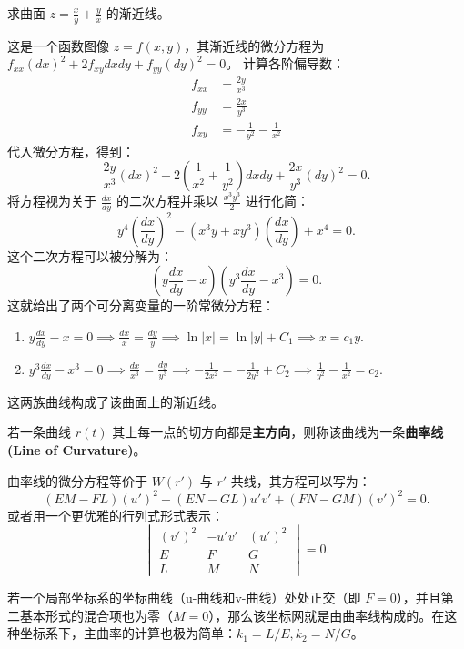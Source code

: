 \documentclass[lang=cn,10pt,thmcnt=section]{elegantbook}
\begin{document}
\begin{example}[求双曲抛物面的渐近线]
    求曲面 $z = \frac{x}{y} + \frac{y}{x}$ 的渐近线。
    
    这是一个函数图像 $z=f(x,y)$，其渐近线的微分方程为 $f_{xx}(dx)^2 + 2f_{xy}dxdy + f_{yy}(dy)^2 = 0$。
    计算各阶偏导数：
    \begin{align*}
        f_{xx} &= \frac{2y}{x^3} \\
        f_{yy} &= \frac{2x}{y^3} \\
        f_{xy} &= -\frac{1}{y^2} - \frac{1}{x^2}
    \end{align*}
    代入微分方程，得到：
    \[
    \frac{2y}{x^3}(dx)^2 - 2\left(\frac{1}{x^2} + \frac{1}{y^2}\right)dxdy + \frac{2x}{y^3}(dy)^2 = 0.
    \]
    将方程视为关于 $\frac{dx}{dy}$ 的二次方程并乘以 $\frac{x^3y^3}{2}$ 进行化简：
    \[
    y^4 \left(\frac{dx}{dy}\right)^2 - (x^3y + xy^3)\left(\frac{dx}{dy}\right) + x^4 = 0.
    \]
    这个二次方程可以被分解为：
    \[
    \left( y\frac{dx}{dy} - x \right) \left( y^3\frac{dx}{dy} - x^3 \right) = 0.
    \]
    这就给出了两个可分离变量的一阶常微分方程：
    \begin{enumerate}
        \item $y\frac{dx}{dy} - x = 0 \implies \frac{dx}{x} = \frac{dy}{y} \implies \ln|x| = \ln|y| + C_1 \implies x = c_1 y$.
        \item $y^3\frac{dx}{dy} - x^3 = 0 \implies \frac{dx}{x^3} = \frac{dy}{y^3} \implies -\frac{1}{2x^2} = -\frac{1}{2y^2} + C_2 \implies \frac{1}{y^2} - \frac{1}{x^2} = c_2$.
    \end{enumerate}
    这两族曲线构成了该曲面上的渐近线。
\end{example}

\begin{definition}[曲率线]
    若一条曲线 $r(t)$ 其上每一点的切方向都是\textbf{主方向}，则称该曲线为一条\textbf{曲率线 (Line of Curvature)}。
    
    曲率线的微分方程等价于 $W(r')$ 与 $r'$ 共线，其方程可以写为：
    \[
    (EM-FL)(u')^2 + (EN-GL)u'v' + (FN-GM)(v')^2 = 0.
    \]
    或者用一个更优雅的行列式形式表示：
    \[
    \begin{vmatrix}
    (v')^2 & -u'v' & (u')^2 \\
    E & F & G \\
    L & M & N
    \end{vmatrix} = 0.
    \]
\end{definition}

\begin{corollary}
    若一个局部坐标系的坐标曲线（u-曲线和v-曲线）处处正交（即 $F=0$），并且第二基本形式的混合项也为零（$M=0$），那么该坐标网就是由曲率线构成的。在这种坐标系下，主曲率的计算也极为简单：$k_1 = L/E, k_2 = N/G$。
\end{corollary}
\end{document}
